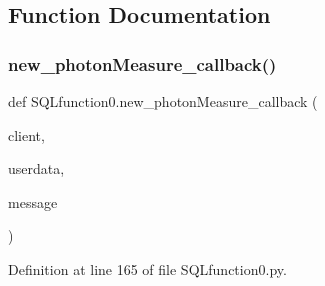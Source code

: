 \subsection{Function Documentation}
\mbox{\label{namespace_s_q_lfunction0_ab9b9ddec7a9cc70e1b4f202c5ad24f1d}} 
\subsubsection{new\+\_\+photon\+Measure\+\_\+callback()}
{\footnotesize\ttfamily def S\+Q\+Lfunction0.\+new\+\_\+photon\+Measure\+\_\+callback (\begin{DoxyParamCaption}\item[{}]{client,  }\item[{}]{userdata,  }\item[{}]{message }\end{DoxyParamCaption})}



Definition at line 165 of file S\+Q\+Lfunction0.\+py.


